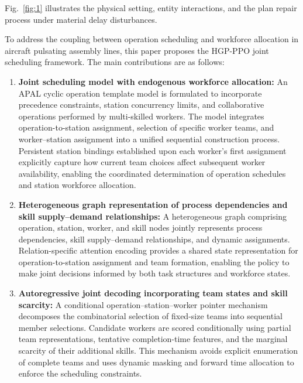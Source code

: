 \documentclass[journal,10pt]{IEEEtran}
\begin{document}
Fig.~\ref{fig:1} illustrates the physical setting, entity interactions, and the plan repair process under material delay disturbances.

To address the coupling between operation scheduling and workforce allocation in aircraft pulsating assembly lines, this paper proposes the HGP-PPO joint scheduling framework. The main contributions are as follows:
\begin{enumerate}
\item \textbf{Joint scheduling model with endogenous workforce allocation:} An APAL cyclic operation template model is formulated to incorporate precedence constraints, station concurrency limits, and collaborative operations performed by multi-skilled workers. The model integrates operation-to-station assignment, selection of specific worker teams, and worker--station assignment into a unified sequential construction process. Persistent station bindings established upon each worker's first assignment explicitly capture how current team choices affect subsequent worker availability, enabling the coordinated determination of operation schedules and station workforce allocation.
\item \textbf{Heterogeneous graph representation of process dependencies and skill supply--demand relationships:} A heterogeneous graph comprising operation, station, worker, and skill nodes jointly represents process dependencies, skill supply--demand relationships, and dynamic assignments. Relation-specific attention encoding provides a shared state representation for operation-to-station assignment and team formation, enabling the policy to make joint decisions informed by both task structures and workforce states.
\item \textbf{Autoregressive joint decoding incorporating team states and skill scarcity:} A conditional operation--station--worker pointer mechanism decomposes the combinatorial selection of fixed-size teams into sequential member selections. Candidate workers are scored conditionally using partial team representations, tentative completion-time features, and the marginal scarcity of their additional skills. This mechanism avoids explicit enumeration of complete teams and uses dynamic masking and forward time allocation to enforce the scheduling constraints.
\end{enumerate}
\end{document}

